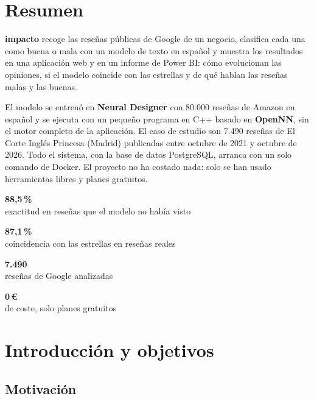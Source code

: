 \documentclass[11pt,a4paper]{article}
\newcommand{\pct}[1]{#1\,\%}
\newcommand{\cifra}[2]{%
  \begin{minipage}[t]{0.235\linewidth}\centering
    {\fontsize{22}{24}\selectfont\sffamily\bfseries\color{accent}#1}\\[4pt]
    {\small\color{ink}#2}
  \end{minipage}}
\begin{document}
\section*{Resumen}

\textbf{impacto} recoge las reseñas públicas de Google de un negocio, clasifica cada una como buena o mala con un
modelo de texto en español y muestra los resultados en una aplicación web y en un informe de Power BI: cómo
evolucionan las opiniones, si el modelo coincide con las estrellas y de qué hablan las reseñas malas y las buenas.

El modelo se entrenó en \textbf{Neural Designer} con 80.000 reseñas de Amazon en español y se ejecuta con un
pequeño programa en C++ basado en \textbf{OpenNN}, sin el motor completo de la aplicación. El caso de estudio son
7.490 reseñas de El Corte Inglés Princesa (Madrid) publicadas entre octubre de 2021 y octubre de 2026. Todo el
sistema, con la base de datos PostgreSQL, arranca con un solo comando de Docker. El proyecto no ha costado nada:
solo se han usado herramientas libres y planes gratuitos.

\vspace{10pt}
\noindent
\cifra{\pct{88,5}}{exactitud en reseñas que el modelo no había visto}\hfill
\cifra{\pct{87,1}}{coincidencia con las estrellas en reseñas reales}\hfill
\cifra{7.490}{reseñas de Google analizadas}\hfill
\cifra{0\,€}{de coste, solo planes gratuitos}
\vspace{14pt}

\noindent{\color{rule}\rule{\linewidth}{0.6pt}}
\vspace{-14pt}
\renewcommand{\contentsname}{\normalsize\sffamily\bfseries Contenido}
{\small\tableofcontents}

\newpage

\section{Introducción y objetivos}

\subsection{Motivación}
\end{document}
